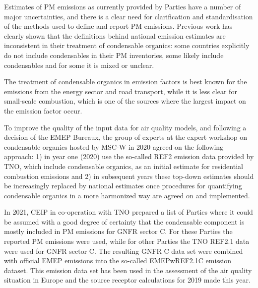 Estimates of PM emissions as currently provided by Parties have a number of major uncertainties, and there is a clear need for clarification and standardisation of the methods used to define and report PM emissions. 
Previous work has clearly shown that the definitions behind national emission estimates are inconsistent in their treatment of condensable organics: some countries explicitly do not include condensables in their PM inventories, some likely include condensables and for some it is mixed or unclear.

The treatment of condensable organics in emission factors is best known for the emissions from the energy sector and road transport, while it is less clear for small-scale combustion, which is one of the sources where the largest impact on the emission factor occur.

To improve the quality of the input data for air quality models, and following a decision of the EMEP Bureaux, the group of experts at the expert workshop on condensable organics hosted by MSC-W in 2020 agreed on the following approach: 1) in year one (2020) use the so-called REF2 emission data provided by TNO, which include condensable organics, as an initial estimate for residential combustion emissions and 2) in subsequent years these top-down estimates should be increasingly replaced by national estimates once procedures for quantifying condensable organics in a more harmonized way are agreed on and implemented. 

In 2021, CEIP in co-operation with TNO prepared a list of Parties where it could be assumed with a good degree of certainty that the condensable component is mostly included in PM emissions for GNFR sector C. For these Parties the reported PM emissions were used, while for other Parties the TNO REF2.1 data were used for GNFR sector C. The resulting GNFR C data set were combined with official EMEP emissions into the so-called EMEPwREF2.1C emission dataset. This emission data set has been used in the assessment of the air quality situation in Europe and the source receptor calculations for 2019 made this year. 

